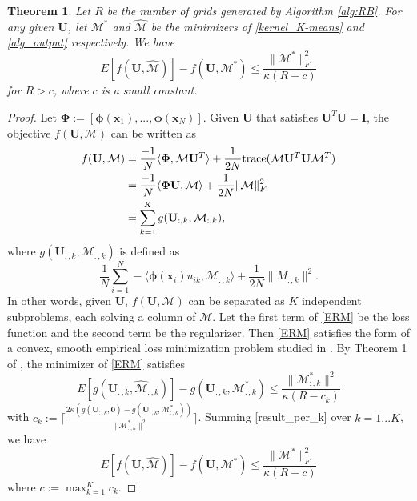 \documentclass[sigconf]{acmart}
\newtheorem{theorem}{Theorem}
\newcommand{\1}{\boldsymbol{1}}
\newcommand{\bx}{\boldsymbol{x}}
\newcommand{\bU}{\mathbf{U}}
\newcommand{\bI}{\mathbf{I}}
\newcommand{\cM}{\mathcal{M}}
\newcommand{\cMh}{\widehat{\cM}}
\newcommand{\bPhi}{\mathbf{\Phi}}
\newcommand{\tr}{\textnormal{trace}}
\newcommand{\bphi}{\boldsymbol{\phi}}
\newcommand{\0}{\boldsymbol{0}}
\begin{document}
\begin{theorem}\label{thm:RBconverge}
Let $R$ be the number of grids generated by Algorithm \ref{alg:RB}. For any given $\bU$, let $\cM^*$ and $\cMh$ be the minimizers of \eqref{kernel_K-means} and \eqref{alg_output} respectively. We have
\begin{equation}\label{eq:RBconvergence}
E[f(\bU,\cMh)] - f(\bU,\cM^*) \leq \frac{\|\cM^*\|_F^2}{\kappa (R-c)}
\end{equation}
for $R>c$, where $c$ is a small constant.
\end{theorem}
\begin{proof}
Let $\bPhi:=[\bphi(\bx_1),...,\bphi(\bx_N)]$. Given $\bU$ that satisfies $\bU^T\bU=\bI$, the objective $f(\bU,\cM)$ can be written as
\begin{align*}
f(\bU,\cM)&=\frac{-1}{N}\langle\bPhi,\cM\bU^T\rangle + \frac{1}{2N} \tr(\cM\bU^T\bU\cM^T)\\
&= \frac{-1}{N}\langle \bPhi \bU ,\cM\rangle + \frac{1}{2N}\|\cM\|_F^2\\
&=\sum_{k=1}^K g(\bU_{:,k},\cM_{:,k}),
\end{align*}
where $g(\bU_{:,k},\cM_{:,k})$ is defined as
\begin{equation}\label{ERM}
\frac{1}{N}\sum_{i=1}^N -\langle \bphi(\bx_i)u_{ik},\cM_{:,k}\rangle+\frac{1}{2N}\|M_{:,k}\|^2.
\end{equation}
In other words, given $\bU$, $f(\bU,\cM)$ can be separated as $K$ independent subproblems, each solving a column of $\cM$. Let the first term of \eqref{ERM} be the loss function and the second term be the regularizer. Then \eqref{ERM} satisfies the form of a convex, smooth empirical loss minimization problem studied in \cite{wu2016revisiting}. By Theorem 1 of \cite{wu2016revisiting}, the minimizer of \eqref{ERM} satisfies
\begin{equation}\label{result_per_k}
E[g(\bU_{:,k},\cMh_{:,k})]-g(\bU_{:,k},\cM_{:,k}^*) \leq \frac{\|\cM^*_{:,k}\|^2}{\kappa(R-c_k)}
\end{equation}
with $c_k:=\lceil\frac{2\kappa( g(\bU_{:,k},\0)-g(\bU_{:,k},\cM^*_{:,k}))}{\|\cM_{:,k}^*\|^2}\rceil$. Summing \eqref{result_per_k} over $k=1...K$, we have
$$
E[f(\bU,\cMh)] - f(\bU,\cM^*) \leq \frac{\|\cM^*\|_F^2}{\kappa (R-c)}
$$
where $c:=\max_{k=1}^K c_k$.
\end{proof}
\end{document}
